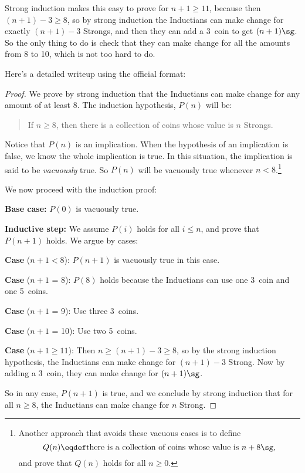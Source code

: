 Strong induction makes this easy to prove for $n+1 \ge 11$, because then
$(n+1)-3 \ge 8$, so by strong induction the Inductians can make change for
exactly $(n+1)-3$ Strongs, and then they can add a 3\sg\ coin to get
$(n+1)\sg$.  So the only thing to do is check that they can make change
for all the amounts from 8 to 10\sg, which is not too hard to do.

Here's a detailed writeup using the official format:

\begin{proof}

  We prove by strong induction that the Inductians can make change for any
  amount of at least 8\sg.  The induction hypothesis, $P(n)$ will be:
\begin{quote}
If $n \geq 8$, then there is a collection of coins whose value is $n$
Strongs.
\end{quote}

Notice that $P(n)$ is an implication.  When the hypothesis of an
implication is false, we know the whole implication is true.  In this
situation, the implication is said to be \emph{vacuously} true.  So $P(n)$
will be vacuously true whenever $n < 8$.\footnote{Another approach that
avoids these vacuous cases is to define
\[
Q(n) \eqdef \text{there is a collection of coins whose value is $n+8\sg$},
\]
and prove that $Q(n)$ holds for all $n \geq 0$.
\iffalse
The solution to
\href{http://courses.csail.mit.edu/6.042/spring06/solutions/cp3fsol.pdf}
{Class Problem 1 from Spring '06, Friday, Feb. 24} uses this approach.\fi
}

We now proceed with the induction proof:

\textbf{Base case:} $P(0)$ is vacuously true.

\textbf{Inductive step:}  We assume $P(i)$ holds for all $i \leq n$, and
prove that $P(n+1)$ holds.  We argue by cases:

\textbf{Case} ($n+1 < 8$): $P(n+1)$ is vacuously true in this case.

\textbf{Case} ($n+1$ = 8): $P(8)$ holds because the Inductians can use one
3\sg\ coin and one 5\sg\ coins.

\textbf{Case} ($n+1$ = 9): Use three 3\sg\ coins.

\textbf{Case} ($n+1$ = 10): Use two 5\sg\ coins.

\textbf{Case} ($n+1 \geq 11$): Then $n \geq (n+1) -3 \geq 8$, so by the
strong induction hypothesis, the Inductians can make change for $(n+1)-3$
Strong.  Now by adding a 3\sg\ coin, they can make change for $(n+1)\sg$.

So in any case, $P(n+1)$ is true, and we conclude by strong induction that
for all $n \geq 8$, the Inductians can make change for $n$ Strong.

\end{proof}

